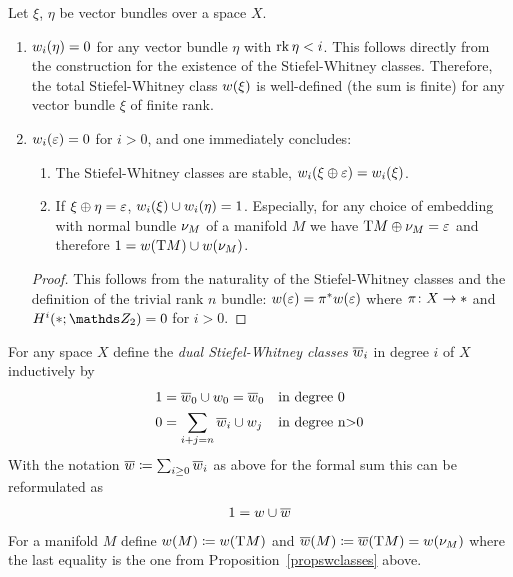 \begin{Rem} %
  \label{propswclasses}
  Let $\xi$, $\eta$ be vector bundles over a space $X$.
  \begin{enumerate} 
  \item $w_i(\eta) = 0$
    for any vector bundle $\eta$ with $\operatorname{rk}\eta < i$.
    This follows directly from the construction for the existence of
    the Stiefel-Whitney classes.
    Therefore, the total Stiefel-Whitney class $w(\xi)$ is
    well-defined (\idest the sum is finite)
    for any vector bundle $\xi$ of finite rank.
  \item $w_i(\varepsilon)=0$ for $i>0$, and one immediately concludes:
    \begin{enumerate}
    \item The Stiefel-Whitney classes are stable, \idest
      $w_i(\xi\oplus\varepsilon) = w_i(\xi)$.
    \item If $\xi\oplus\eta = \varepsilon$, $w_i(\xi)\cup w_i(\eta)=1$.
      Especially, for any choice of embedding with normal bundle $\nu_{M}$
      of a manifold $M$ we have $\mathrm{T}M \oplus \nu_{M} = \varepsilon$ and
      therefore $1 = w(\mathrm{T}M) \cup w(\nu_{M})$.
    \end{enumerate}
    \begin{proof} %
      This follows from the naturality of the Stiefel-Whitney classes
      and the definition of the trivial rank $n$ bundle:
      $w(\varepsilon) = {\pi}^* w(\varepsilon)$ where $\pi\colon X\to*$
      and $H^i(\pt;\Zmod2) = 0$ for $i>0$.
    \end{proof}
  \end{enumerate}
\end{Rem}

\begin{Def}
  For any space $X$ define the \emph{dual Stiefel-Whitney classes}
  $\overline{w}_i$ in degree $i$ of $X$ inductively by
  \begin{align*}
    1 &= \overline{w}_0\cup w_0 = \overline{w}_0    &&\text{in degree 0}\\
    0 &= \sum_{i+j=n} \overline{w}_i\cup w_j  &&\text{in degree n>0}
  \end{align*}
  With the notation $\overline{w}\coloneqq \sum_{i\geq0} \overline{w}_i$ as above
  for the formal sum this can be reformulated as
  \begin{gather*}
    1 = w\cup\overline{w}
  \end{gather*}
  For a manifold $M$ define
  $w(M) \coloneqq w(\mathrm{T}M)$ and
  $\overline{w}(M) \coloneqq \overline{w}(\mathrm{T}M) = w(\nu_{M})$
  where the last equality is the one from
  Proposition~\ref{propswclasses} above.
\end{Def}

